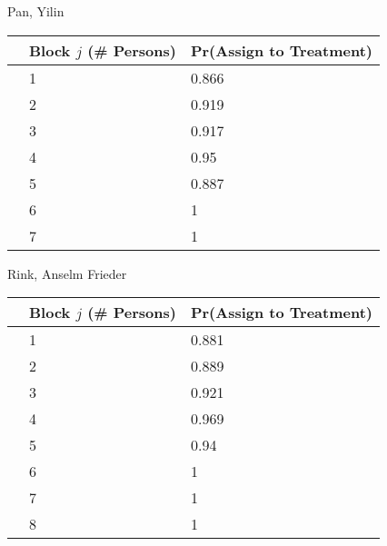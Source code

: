 \documentclass[11pt,notitlepage]{article}
\begin{document}
\begin{table}[h!]
\begin{center}
\begin{minipage}[t]{0.45\linewidth}\centering

Pan, Yilin

\begin{tabular}{rll}
  \hline
 & Block $j$ (\# Persons) & Pr(Assign to Treatment) \\ 
  \hline
  & 1 & 0.866 \\ 
  & 2 & 0.919 \\ 
  & 3 & 0.917 \\ 
  & 4 & 0.95 \\ 
  & 5 & 0.887 \\ 
  & 6 & 1 \\ 
  & 7 & 1 \\ 
   \hline
\end{tabular}

\end{minipage}
\hspace{0.5cm}
\begin{minipage}[t]{0.45\linewidth}\centering

Rink, Anselm Frieder

\begin{tabular}{rll}
  \hline
 & Block $j$ (\# Persons) & Pr(Assign to Treatment) \\ 
  \hline
& 1 & 0.881 \\ 
& 2 & 0.889 \\ 
& 3 & 0.921 \\ 
& 4 & 0.969 \\ 
& 5 & 0.94 \\ 
& 6 & 1 \\ 
& 7 & 1 \\ 
& 8 & 1 \\ 
   \hline
\end{tabular}

\end{minipage}

\end{center}
\end{table}

\clearpage
\end{document}
